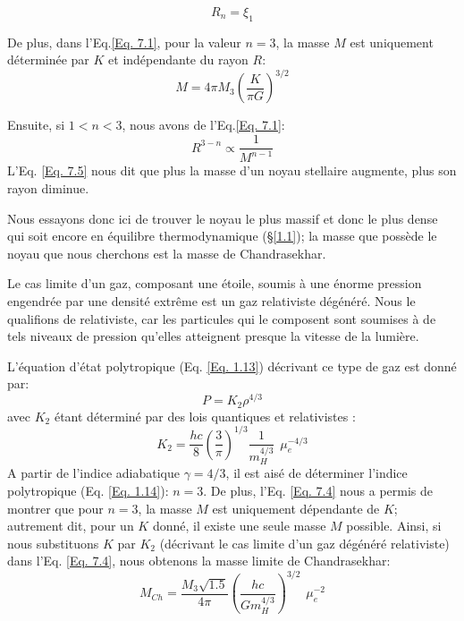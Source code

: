 \begin{equation}R_{n}=\xi_{1}\label{Eq. 7.3}\end{equation}

De plus, dans l'Eq.\ref{Eq. 7.1}, pour la valeur $n=3$, la masse $M$ est uniquement déterminée par $K$ et indépendante du rayon $R$: 
\begin{equation}M=4\pi M_{3}\left(\dfrac{K}{\pi G}\right)^{3/2}\label{Eq. 7.4}\end{equation}

Ensuite, si $1<n<3$, nous avons de l'Eq.\ref{Eq. 7.1}:
\begin{equation}R^{3-n}\propto\dfrac{1}{M^{n-1}}\label{Eq. 7.5}\end{equation} L'Eq. \ref{Eq. 7.5} nous dit que plus la masse d'un noyau stellaire augmente, plus son rayon diminue.\smallskip 

Nous essayons donc ici de trouver le noyau le plus massif et donc le plus dense qui soit encore en équilibre thermodynamique (§\ref{1.1}); la masse que possède le noyau que nous cherchons est la masse de Chandrasekhar.\smallskip

Le cas limite d'un gaz, composant une étoile, soumis à une énorme pression engendrée par une densité extrême est un gaz relativiste dégénéré. Nous le qualifions de relativiste, car les particules qui le composent sont soumises à de tels niveaux de pression qu'elles atteignent presque la vitesse de la lumière.\smallskip

L'équation d'état polytropique (Eq. \ref{Eq. 1.13}) décrivant ce type de gaz est donné par:\begin{equation}P=K_{2}  \rho^{4/3}\label{Eq.7.6}\end{equation}
avec $K_{2}$ étant déterminé par des lois quantiques et relativistes \autocite{prialnikIntroductionTheoryStellar2009}:
\begin{equation}K_{2}=\dfrac{hc}{8}\left(\dfrac{3}{\pi}\right)^{1/3} \dfrac{1}{m_{H}^{4/3}}\hspace{5pt}\mu_e^{-4/3}\label{Eq. 7.7}\end{equation}
A partir de l'indice adiabatique $\gamma = 4/3$, il est aisé de déterminer l'indice polytropique (Eq. \ref{Eq. 1.14}): $n=3$. De plus, l'Eq. \ref{Eq. 7.4} nous a permis de montrer que pour $n=3$, la masse $M$ est uniquement dépendante de $K$; autrement dit, pour un $K$ donné, il existe une seule masse $M$ possible. Ainsi, si nous substituons $K$ par $K_{2}$ (décrivant le cas limite d'un gaz dégénéré relativiste) dans l'Eq. \ref{Eq. 7.4}, nous obtenons la masse limite de Chandrasekhar: \begin{equation}M_{Ch}=\dfrac{M_{3}\sqrt{1.5}}{4\pi}\left( \dfrac{hc}{Gm_{H}^{4/3}}\right)^{3/2}\hspace{5pt}\mu_{e}^{-2}\label{Eq. 7.8}\end{equation}

